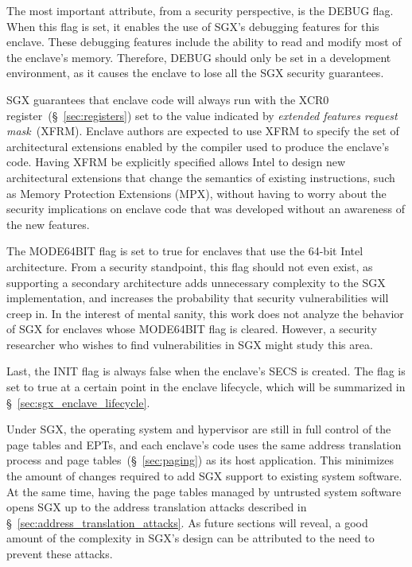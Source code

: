 The most important attribute, from a security perspective, is the DEBUG flag.
When this flag is set, it enables the use of SGX's debugging features for this
enclave. These debugging features include the ability to read and modify most
of the enclave's memory. Therefore, DEBUG should only be set in a development
environment, as it causes the enclave to lose all the SGX security guarantees.

SGX guarantees that enclave code will always run with the XCR0
register~(\S~\ref{sec:registers}) set to the value indicated by
\textit{extended features request mask}~(XFRM). Enclave authors are expected to
use XFRM to specify the set of architectural extensions enabled by the compiler
used to produce the enclave's code. Having XFRM be explicitly specified allows
Intel to design new architectural extensions that change the semantics of
existing instructions, such as Memory Protection Extensions (MPX), without
having to worry about the security implications on enclave code that was
developed without an awareness of the new features.

The MODE64BIT flag is set to true for enclaves that use the 64-bit Intel
architecture. From a security standpoint, this flag should not even exist, as
supporting a secondary architecture adds unnecessary complexity to the SGX
implementation, and increases the probability that security vulnerabilities
will creep in. In the interest of mental sanity, this work does not analyze the
behavior of SGX for enclaves whose MODE64BIT flag is cleared. However, a
security researcher who wishes to find vulnerabilities in SGX might study this
area.

Last, the INIT flag is always false when the enclave's SECS is created. The
flag is set to true at a certain point in the enclave lifecycle, which will be
summarized in \S~\ref{sec:sgx_enclave_lifecycle}.


\label{sec:sgx_paging}


Under SGX, the operating system and hypervisor are still in full control of the
page tables and EPTs, and each enclave's code uses the same address translation
process and page tables~(\S~\ref{sec:paging}) as its host application. This
minimizes the amount of changes required to add SGX support to existing system
software. At the same time, having the page tables managed by untrusted system
software opens SGX up to the address translation attacks described in
\S~\ref{sec:address_translation_attacks}. As future sections will reveal, a
good amount of the complexity in SGX's design can be attributed to the need to
prevent these attacks.

